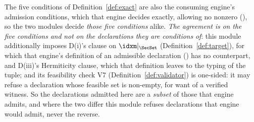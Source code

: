 
\begin{remark}\label{rem:engine-admission}
The five conditions of Definition~\ref{def:exact} are also the consuming
engine's admission conditions, which that engine decides exactly, allowing
no nonzero 
(), so the two modules
decide \emph{those five conditions} alike. \emph{The agreement is on the five
conditions and not on the declarations they are conditions of}: this module
additionally imposes D(i)'s clause on $\idxm|_{\SecSet}$
(Definition~\ref{def:target}), for which that engine's definition of an
admissible declaration () has no
counterpart, and D(iii)'s Hermiticity clause, which that definition leaves to
the typing of the tuple;
and its feasibility check V7 (Definition~\ref{def:validator}) is one-sided:
it may refuse a declaration whose feasible set is non-empty, for want of a
verified witness. So the declarations admitted
here are a \emph{subset} of those that engine admits, and where the two
differ this module refuses declarations that engine would admit, never the
reverse.
\end{remark}
